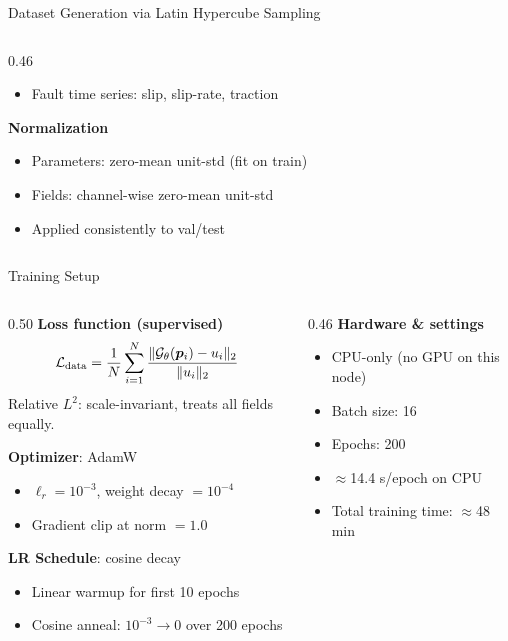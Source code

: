 \documentclass[aspectratio=169,12pt]{beamer}
\newcommand{\G}{\mathcal{G}_\theta}
\newcommand{\loss}{\mathcal{L}}
\begin{document}
\begin{frame}{Dataset Generation via Latin Hypercube Sampling}
\begin{columns}[T]
\begin{column}{0.46\textwidth}
\begin{itemize}
        \item Fault time series: slip, slip-rate, traction
      \end{itemize}
      \vspace{6pt}
      \textbf{Normalization}
      \begin{itemize}
        \item Parameters: zero-mean unit-std (fit on train)
        \item Fields: channel-wise zero-mean unit-std
        \item Applied consistently to val/test
      \end{itemize}
    \end{column}
  \end{columns}
\end{frame}

\begin{frame}{Training Setup}
  \begin{columns}[T]
    \begin{column}{0.50\textwidth}
      \textbf{Loss function (supervised)}
      \[
        \loss_{\rm data} = \frac{1}{N}\sum_{i=1}^N
        \frac{\|\G(\bm{p}_i) - u_i\|_2}{\|u_i\|_2}
      \]
      Relative $L^2$: scale-invariant, treats all fields equally.

      \vspace{8pt}
      \textbf{Optimizer}: AdamW
      \begin{itemize}
        \item $\ell_r = 10^{-3}$, weight decay $= 10^{-4}$
        \item Gradient clip at norm $= 1.0$
      \end{itemize}

      \vspace{6pt}
      \textbf{LR Schedule}: cosine decay
      \begin{itemize}
        \item Linear warmup for first 10 epochs
        \item Cosine anneal: $10^{-3} \to 0$ over 200 epochs
      \end{itemize}
    \end{column}
    \begin{column}{0.46\textwidth}
      \textbf{Hardware \& settings}
      \begin{itemize}
        \item CPU-only (no GPU on this node)
        \item Batch size: 16
        \item Epochs: 200
        \item $\approx$14.4 s/epoch on CPU
        \item Total training time: $\approx$48 min
      \end{itemize}


\end{column}
\end{columns}
\end{frame}
\end{document}
